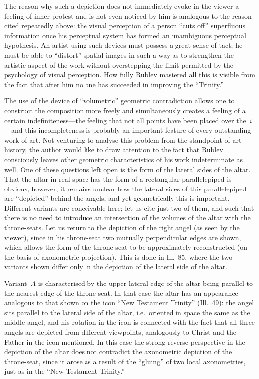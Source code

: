 
The reason why such a depiction does not immediately evoke in the viewer a feeling of
inner protest and is not even noticed by him is analogous to the reason cited repeatedly
above: the visual perception of a person ``cuts off'' superfluous information once his
perceptual system has formed an unambiguous perceptual hypothesis.  An artist using such
devices must possess a great sense of tact; he must be able to ``distort'' spatial images
in such a way as to strengthen the artistic aspect of the work without overstepping the
limit permitted by the psychology of visual perception.  How fully Rublev mastered all
this is visible from the fact that after him no one has succeeded in improving the
``Trinity.''

The use of the device of ``volumetric'' geometric contradiction allows one to construct
the composition more freely and simultaneously creates a feeling of a certain
indefiniteness---the feeling that not all points have been placed over the~$i$---and
this incompleteness is probably an important feature of every outstanding work of art.
Not venturing to analyse this problem from the standpoint of art history, the author
would like to draw attention to the fact that Rublev consciously leaves other geometric
characteristics of his work indeterminate as well.  One of these questions left open is
the form of the lateral sides of the altar.  That the altar in real space has the form
of a rectangular parallelepiped is obvious; however, it remains unclear how the lateral
sides of this parallelepiped are ``depicted'' behind the angels, and yet geometrically
this is important.  Different variants are conceivable here; let us cite just two of them,
and such that there is no need to introduce an intersection of the volumes of the altar
with the throne-seats.  Let us return to the depiction of the right angel (as seen by
the viewer), since in his throne-seat two mutually perpendicular edges are shown, which
allows the form of the throne-seat to be approximately reconstructed (on the basis of
axonometric projection).  This is done in Ill.~85, where the two variants shown differ
only in the depiction of the lateral side of the altar.

Variant~$A$ is characterised by the upper lateral edge of the altar being parallel to the
nearest edge of the throne-seat.  In that case the altar has an appearance analogous to
that shown on the icon ``New Testament Trinity'' (Ill.~49): the angel sits parallel to
the lateral side of the altar, i.e.\ oriented in space the same as the middle angel, and
his rotation in the icon is connected with the fact that all three angels are depicted
from different viewpoints, analogously to Christ and the Father in the icon mentioned.
In this case the strong reverse perspective in the depiction of the altar does not
contradict the axonometric depiction of the throne-seat, since it arose as a result of
the ``gluing'' of two local axonometries, just as in the ``New Testament Trinity.''

